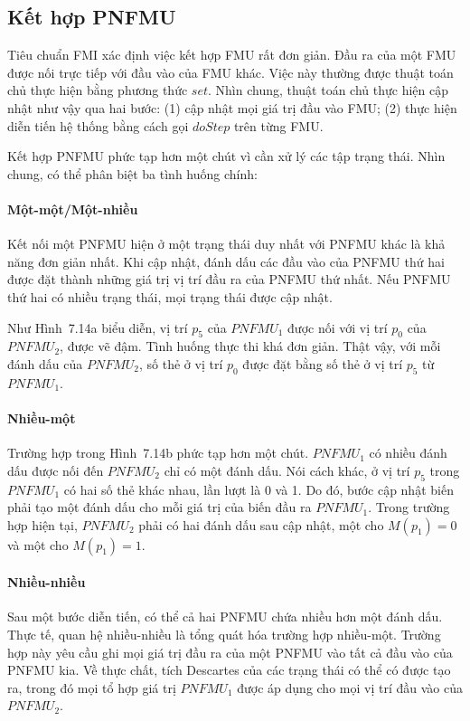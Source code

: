 \subsection{Kết hợp PNFMU}
Tiêu chuẩn FMI xác định việc kết hợp FMU rất đơn giản. Đầu ra của một FMU được nối trực tiếp với đầu vào của FMU khác. Việc này thường được thuật toán chủ thực hiện bằng phương thức $set$. Nhìn chung, thuật toán chủ thực hiện cập nhật như vậy qua hai bước: (1) cập nhật mọi giá trị đầu vào FMU; (2) thực hiện diễn tiến hệ thống bằng cách gọi $doStep$ trên từng FMU.

Kết hợp PNFMU phức tạp hơn một chút vì cần xử lý các tập trạng thái. Nhìn chung, có thể phân biệt ba tình huống chính:

\paragraph{Một-một/Một-nhiều}
Kết nối một PNFMU hiện ở một trạng thái duy nhất với PNFMU khác là khả năng đơn giản nhất. Khi cập nhật, đánh dấu các đầu vào của PNFMU thứ hai được đặt thành những giá trị vị trí đầu ra của PNFMU thứ nhất. Nếu PNFMU thứ hai có nhiều trạng thái, mọi trạng thái được cập nhật.

Như Hình~7.14a biểu diễn, vị trí $p_5$ của $PNFMU_1$ được nối với vị trí $p_0$ của $PNFMU_2$, được vẽ đậm. Tình huống thực thi khá đơn giản. Thật vậy, với mỗi đánh dấu của $PNFMU_2$, số thẻ ở vị trí $p_0$ được đặt bằng số thẻ ở vị trí $p_5$ từ $PNFMU_1$.

\paragraph{Nhiều-một}
Trường hợp trong Hình~7.14b phức tạp hơn một chút. $PNFMU_1$ có nhiều đánh dấu được nối đến $PNFMU_2$ chỉ có một đánh dấu. Nói cách khác, ở vị trí $p_5$ trong $PNFMU_1$ có hai số thẻ khác nhau, lần lượt là 0 và 1. Do đó, bước cập nhật biến phải tạo một đánh dấu cho mỗi giá trị của biến đầu ra $PNFMU_1$. Trong trường hợp hiện tại, $PNFMU_2$ phải có hai đánh dấu sau cập nhật, một cho $M(p_1)=0$ và một cho $M(p_1)=1$.

\paragraph{Nhiều-nhiều}
Sau một bước diễn tiến, có thể cả hai PNFMU chứa nhiều hơn một đánh dấu. Thực tế, quan hệ nhiều-nhiều là tổng quát hóa trường hợp nhiều-một. Trường hợp này yêu cầu ghi mọi giá trị đầu ra của một PNFMU vào tất cả đầu vào của PNFMU kia. Về thực chất, tích Descartes của các trạng thái có thể có được tạo ra, trong đó mọi tổ hợp giá trị $PNFMU_1$ được áp dụng cho mọi vị trí đầu vào của $PNFMU_2$.

